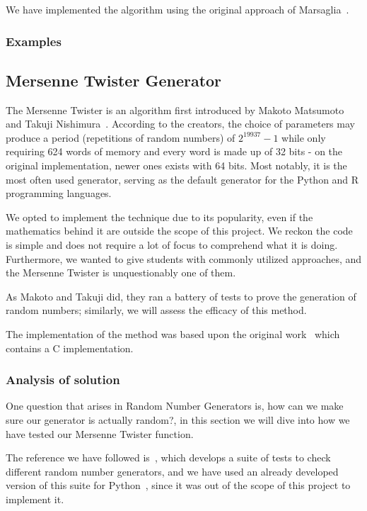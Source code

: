 We have implemented the algorithm using the original approach of Marsaglia~\cite{10.1214/aoap/1177005878}.
\subsubsection{Examples}
	


\subsection{Mersenne Twister Generator}
The Mersenne Twister is an algorithm first introduced by Makoto Matsumoto and Takuji Nishimura~\cite{matsumoto1998mersenne}. According to the creators, the choice of parameters may produce a period (repetitions of random numbers) of $2^{19937}-1$ while only requiring 624 words of memory and every word is made up of 32 bits - on the original implementation, newer ones exists with 64 bits. Most notably, it is the most often used generator, serving as the default generator for the Python and R programming languages.

We opted to implement the technique due to its popularity, even if the mathematics behind it are outside the scope of this project. We reckon the code is simple and does not require a lot of focus to comprehend what it is doing. Furthermore, we wanted to give students with commonly utilized approaches, and the Mersenne Twister is unquestionably one of them.

As Makoto and Takuji did, they ran a battery of tests to prove the generation of random numbers; similarly, we will assess the efficacy of this method.

The implementation of the method was based upon the original work~\cite{matsumoto1998mersenne} which contains a C implementation.
\subsubsection{Analysis of solution}
One question that arises in Random Number Generators is, how can we make sure our generator is actually random?, in this section we will dive into how we have tested our Mersenne Twister function.

The reference we have followed is~\cite{smid2010statistical}, which develops a suite of tests to check different random number generators, and we have used an already developed version of this suite for Python~\cite{InsaneMonster2022}, since it was out of the scope of this project to implement it. 


